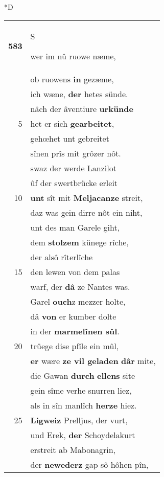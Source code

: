 \documentclass[8pt,a4paper,notitlepage]{article}
\begin{document}
\begin{table}[ht]
\begin{minipage}[t]{0.5\linewidth}
\small
\begin{center}*D
\end{center}
\begin{tabular}{rl}
\textbf{583} & \begin{large}S\end{large}wer im nû ruowe næme,\\ 
 & ob ruowens \textbf{in} gezæme,\\ 
 & ich wæne, \textbf{der} hetes sünde.\\ 
 & nâch der âventiure \textbf{urkünde}\\ 
5 & het er sich \textbf{gearbeitet},\\ 
 & gehœhet unt gebreitet\\ 
 & sînen prîs mit grôzer nôt.\\ 
 & swaz der werde Lanzilot\\ 
 & ûf der swertbrücke erleit\\ 
10 & \textbf{unt} sît mit \textbf{Meljacanze} streit,\\ 
 & daz was gein dirre nôt ein niht,\\ 
 & unt des man Garele giht,\\ 
 & dem \textbf{stolzem} künege rîche,\\ 
 & der alsô rîterlîche\\ 
15 & den lewen von dem palas\\ 
 & warf, der \textbf{dâ} ze Nantes was.\\ 
 & Garel \textbf{ouch}z mezzer holte,\\ 
 & dâ \textbf{von} er kumber dolte\\ 
 & in der \textbf{marmelînen sûl}.\\ 
20 & trüege dise pfîle ein mûl,\\ 
 & \textbf{er} wære \textbf{ze vil geladen} \textbf{dâr} mite,\\ 
 & die Gawan \textbf{durch} \textbf{ellens} site\\ 
 & gein sîme verhe snurren liez,\\ 
 & als in sîn manlîch \textbf{herze} hiez.\\ 
25 & \textbf{Ligweiz} Prelljus, der vurt,\\ 
 & und Erek, \textbf{der} Schoydelakurt\\ 
 & erstreit ab Mabonagrin,\\ 
 & der \textbf{newederz} gap sô hôhen pîn,\\ 

\end{tabular}
\end{minipage}
\end{table}
\end{document}
